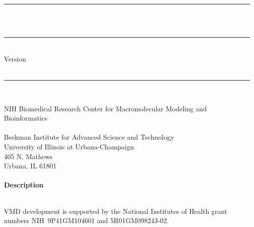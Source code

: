 \begin{center}
  \rule{6in}{0.04in}				\\	\vspace{0.25in}
  {\Huge \VMD\ \DOCTITLE}			\\	\vspace{0.25in}
  \rule{6in}{0.04in}				\\	\vspace{0.25in}
  {\Large Version \VMDVER}			\\	\vspace{0.20in}
  \VMDDATE					\\	\vspace{0.20in}
  \rule{6in}{0.04in}				\\	\vspace{0.25in}


  {\Large NIH Biomedical Research Center for Macromolecular Modeling and Bioinformatics} \\	\vspace{0.20in}
  {\large       {}           \\
                Beckman Institute for Advanced Science and Technology  \\
                University of Illinois at Urbana-Champaign             \\
                405 N. Mathews                                         \\
                Urbana, IL  61801                                      \\
		\vspace{0.1in}  \\
  }
  \vspace{0.5in}
  {\Large \bf Description}
  \vspace{0.1in}
\end{center}

{\DOCDESC}
\vspace{0.1in} \\
VMD development is supported by the National Institutes of Health
grant numbers NIH~9P41GM104601 and 5R01GM098243-02.
